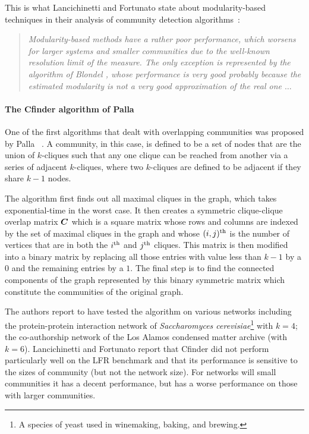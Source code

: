 This is what Lancichinetti and Fortunato state about modularity-based techniques in their analysis of 
community detection algorithms~\cite{LF09}: 
\begin{quote}
	\emph{Modularity-based methods have a rather poor performance, which worsens for larger systems and smaller 
	communities due to the well-known resolution limit of the measure. The only exception is represented 
	by the algorithm of Blondel \emph{\etal}, whose performance is very good probably because the estimated modularity 
	is not a very good approximation of the real one $\ldots$} 
\end{quote}

\paragraph{The Cfinder algorithm of Palla \etal} One of the first algorithms that dealt with overlapping 
communities was proposed by Palla \etal~\cite{PDFV05}. A community, in this case, is defined to be a set of nodes 
that are the union of $k$-cliques such that any one clique can be reached from another via a series of 
adjacent $k$-cliques, where two $k$-cliques are defined to be adjacent if they 
share $k - 1$ nodes. 

The algorithm first finds out all maximal cliques in the graph, which takes exponential-time
in the worst case. It then creates a symmetric clique-clique overlap matrix $\boldsymbol{C}$ which is a square matrix whose 
rows and columns are indexed by the set of maximal cliques in the graph and whose $(i, j)^{\textrm{th}}$ 
is the number of vertices that are in both the $i^{\textrm{th}}$ and $j^{\textrm{th}}$ cliques. This matrix is then modified into 
a binary matrix by replacing all those entries with value less than $k - 1$ by a $0$ and the remaining entries by 
a $1$. The final step is to find the connected components of the graph represented by this binary symmetric matrix
which constitute the communities of the original graph. 

The authors report to have tested the algorithm on various networks including the protein-protein interaction 
network of \emph{Saccharomyces cerevisiae}\footnote{A species of yeast used in winemaking, baking, and brewing.} 
with $k = 4$; the co-authorship network of the Los Alamos condensed matter archive (with $k = 6$). 
Lancichinetti and Fortunato report that Cfinder did not perform particularly well on the LFR benchmark and 
that its performance is sensitive to the sizes of community (but not the network size). For networks will 
small communities it has a decent performance, but has a worse performance on those with larger communities. 

